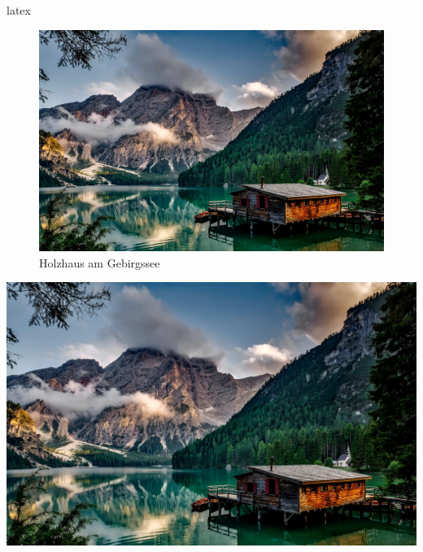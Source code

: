 \begin{showcase}
    \begin{code}{latex}
        \begin{figure}[Hhtbp] %
            \centering %
            \includegraphics[width=0.8\columnwidth]{assets/images/bilder/pexels-pixabay-147411.jpg}
            \caption{Holzhaus am Gebirgssee}
            \label{fig:holzhaus-am-gebirgssee}
        \end{figure}
    \end{code}
    \tcblower
    \begin{center}
        \includegraphics[width=0.8\columnwidth]{assets/images/bilder/pexels-pixabay-147411.jpg}
    \end{center}
\end{showcase}

